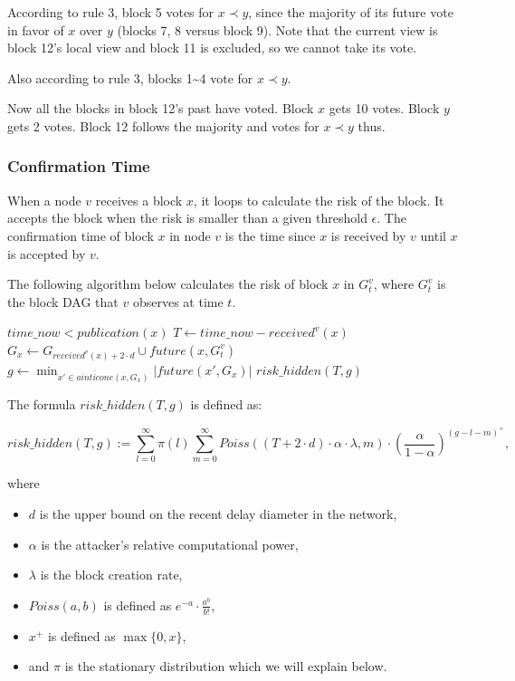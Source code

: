 \documentclass[a4paper,11pt]{article}
\begin{document}
According to rule 3, block 5 votes for $x \prec y$, since the majority of its
future vote in favor of $x$ over $y$ (blocks 7, 8 versus block 9). Note that the
current view is block 12's local view and block 11 is excluded, so we cannot
take its vote.

Also according to rule 3, blocks 1\textasciitilde4 vote for $x \prec y$.

Now all the blocks in block 12's past have voted. Block $x$ gets 10 votes. Block
$y$ gets 2 votes. Block 12 follows the majority and votes for $x \prec y$ thus.


\subsubsection*{Confirmation Time}

When a node $v$ receives a block $x$, it loops to calculate the  risk of
the block. It accepts the block when the risk is smaller than a given threshold
$\epsilon$. The confirmation time of block $x$ in node $v$ is the time
since $x$ is received by $v$ until $x$ is accepted by $v$.

The following algorithm below calculates the  risk of block $x$ in
$G_t^v$, where $G_t^v$ is the block DAG that $v$ observes at time $t$.

\begin{codebox}
\li \If $time\_now < publication(x)$
\li   \Then
      \End
\li $T \gets time\_now - received^v(x)$
\li $G_x \gets G_{received^v(x) + 2 \cdot d} \cup future(x, G_t^v)$
\li $g \gets \min_{x' \in \overline{ainticone}(x,G_x)} |future(x',G_x)|$
\li \Return $risk\_hidden(T,g)$
\end{codebox}

The formula $risk\_hidden(T,g)$ is defined as:

$$
risk\_hidden(T,g) := \sum_{l=0}^{\infty} \pi(l) \sum_{m=0}^{\infty} Poiss((T + 2
\cdot d) \cdot \alpha \cdot \lambda, m) \cdot \left(\frac{\alpha}{1 -
\alpha}\right)^{(g - l - m)^+},
$$

where

\begin{itemize}
	\item $d$ is the upper bound on the recent delay diameter in the network,
	\item $\alpha$ is the attacker’s relative computational power,
	\item $\lambda$ is the block creation rate,
	\item $Poiss(a, b)$ is defined as $e^{-a} \cdot \frac{a^b}{b!}$,
	\item $x^+$ is defined as $\max\{0, x\}$,
	\item and $\pi$ is the stationary distribution which we will explain below.
\end{itemize}
\end{document}
